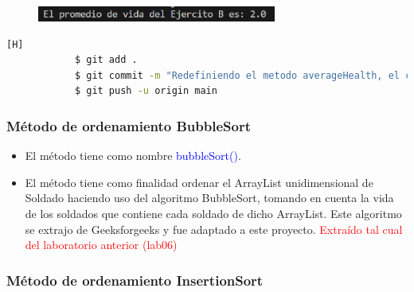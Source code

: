 \documentclass{article}
\begin{document}
        \begin{figure}[H]
            \centering
            \includegraphics[width=0.7\textwidth,keepaspectratio]{img/averageHealth2.png}
            \caption{}
        \end{figure}

        \begin{lstlisting}[language=bash,caption={Commit \href{https://github.com/hernanchoquehuanca/fp2-23b/commit/422d59ae905d11466ef8011ef054ded358973c34}{422d59a}: Se agregó el método averageHealth y sumHealth, siendo el segundo de utilidad para el primero}][H]
    		$ git add .
    		$ git commit -m "Redefiniendo el metodo averageHealth, el cual calcula el promedio de vida de soldados en un ejercito, hace uso de un metodo llamado sumHealth que calcula la suma de la vida en un ejercito"
    		$ git push -u origin main
    	\end{lstlisting}
        
        \newpage
        \subsubsection{Método de ordenamiento BubbleSort}

        \begin{itemize}
            \item El método tiene como nombre \textcolor{blue}{bubbleSort()}.
            \item El método tiene como finalidad ordenar el ArrayList unidimensional de Soldado haciendo uso del algoritmo BubbleSort, tomando en cuenta la vida de los soldados que contiene cada soldado de dicho ArrayList. Este algoritmo se extrajo de Geeksforgeeks y fue adaptado a este proyecto. \textcolor{red}{Extraído tal cual del laboratorio anterior (lab06)}
        \end{itemize}

        
        
        
        \subsubsection{Método de ordenamiento InsertionSort}
        
\end{document}
